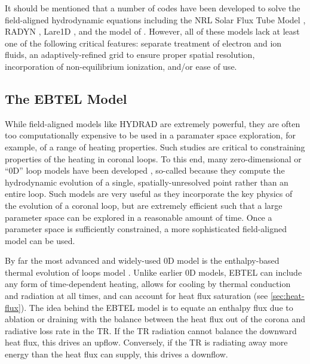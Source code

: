It should be mentioned that a number of codes have been developed to solve the field-aligned hydrodynamic equations including the NRL Solar Flux Tube Model \citep{mariska_numerical_1989,warren_evolving_2003}, RADYN \citep{allred_unified_2015}, Lare1D \citep{johnston_new_2017}, and the model of \citet{mikic_importance_2013}. However, all of these models lack at least one of the following critical features: separate treatment of electron and ion fluids, an adaptively-refined grid to ensure proper spatial resolution, incorporation of non-equilibrium ionization, and/or ease of use. 

\subsection{The EBTEL Model}\label{sec:ebtel}


While field-aligned models like HYDRAD are extremely powerful, they are often too computationally expensive to be used in a paramater space exploration, for example, of a range of heating properties. Such studies are critical to constraining properties of the heating in coronal loops. To this end, many zero-dimensional or ``0D'' loop models have been developed \citep[e.g.][]{kuin_thermal_1982,fisher_equation_1990,kopp_coronal_1993,cargill_implications_1994,aschwanden_hydrodynamic_2009}, so-called because they compute the hydrodynamic evolution of a single, spatially-unresolved point rather than an entire loop. Such models are very useful as they incorporate the key physics of the evolution of a coronal loop, but are extremely efficient such that a large parameter space can be explored in a reasonable amount of time. Once a parameter space is sufficiently constrained, a more sophisticated field-aligned model can be used.

By far the most advanced and widely-used 0D model is the enthalpy-based thermal evolution of loops model \citep[EBTEL,][]{klimchuk_highly_2008}. Unlike earlier 0D models, EBTEL can include any form of time-dependent heating, allows for cooling by thermal conduction and radiation at all times, and can account for heat flux saturation (see \autoref{sec:heat-flux}). The idea behind the EBTEL model is to equate an enthalpy flux due to ablation or draining with the balance between the heat flux out of the corona and radiative loss rate in the TR. If the TR radiation cannot balance the downward heat flux, this drives an upflow. Conversely, if the TR is radiating away more energy than the heat flux can supply, this drives a downflow.

